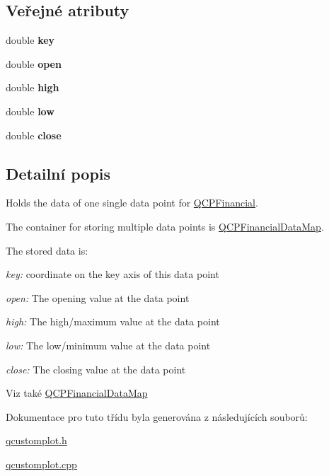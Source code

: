 \subsection*{Veřejné atributy}
\begin{DoxyCompactItemize}
\item 
\hypertarget{classQCPFinancialData_a18bc92126f28c214b05b0161e5f5958b}{}double {\bfseries key}\label{classQCPFinancialData_a18bc92126f28c214b05b0161e5f5958b}

\item 
\hypertarget{classQCPFinancialData_a3059e1e1fbcb9fd243fde0450f238032}{}double {\bfseries open}\label{classQCPFinancialData_a3059e1e1fbcb9fd243fde0450f238032}

\item 
\hypertarget{classQCPFinancialData_a299a4b241296fb6cd1baf5ab03f7126a}{}double {\bfseries high}\label{classQCPFinancialData_a299a4b241296fb6cd1baf5ab03f7126a}

\item 
\hypertarget{classQCPFinancialData_aecce0fb45a115e3f3a25eea78491ac16}{}double {\bfseries low}\label{classQCPFinancialData_aecce0fb45a115e3f3a25eea78491ac16}

\item 
\hypertarget{classQCPFinancialData_a45e9b96944c4a08ea6c82a72d3d22df2}{}double {\bfseries close}\label{classQCPFinancialData_a45e9b96944c4a08ea6c82a72d3d22df2}

\end{DoxyCompactItemize}


\subsection{Detailní popis}
Holds the data of one single data point for \hyperlink{classQCPFinancial}{Q\+C\+P\+Financial}. 

The container for storing multiple data points is \hyperlink{qcustomplot_8h_a745c09823fae0974b50beca9bc3b3d7d}{Q\+C\+P\+Financial\+Data\+Map}.

The stored data is\+: \begin{DoxyItemize}
\item {\itshape key\+:} coordinate on the key axis of this data point \item {\itshape open\+:} The opening value at the data point \item {\itshape high\+:} The high/maximum value at the data point \item {\itshape low\+:} The low/minimum value at the data point \item {\itshape close\+:} The closing value at the data point\end{DoxyItemize}
\begin{DoxySeeAlso}{Viz také}
\hyperlink{qcustomplot_8h_a745c09823fae0974b50beca9bc3b3d7d}{Q\+C\+P\+Financial\+Data\+Map} 
\end{DoxySeeAlso}


Dokumentace pro tuto třídu byla generována z následujících souborů\+:\begin{DoxyCompactItemize}
\item 
\hyperlink{qcustomplot_8h}{qcustomplot.\+h}\item 
\hyperlink{qcustomplot_8cpp}{qcustomplot.\+cpp}\end{DoxyCompactItemize}
